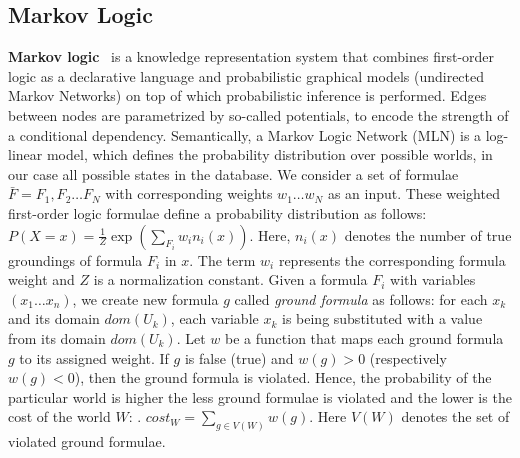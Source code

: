 \subsection{Markov Logic}


\textbf{Markov logic}~\cite{domingos2009markov} is a knowledge representation system that combines first-order logic as a declarative language and probabilistic graphical models (undirected Markov Networks) on top of which probabilistic inference is performed.  Edges between nodes are parametrized by so-called potentials, to encode the strength of a conditional dependency.   
Semantically, a Markov Logic Network (MLN) is a log-linear model, which defines the probability 
distribution over possible worlds, in our case all possible states in the database.%
We consider a set of formulae $\bar{F} = F_1, F_2 \dots F_N$ with corresponding weights $w_1 \dots w_N$ as an input.  These weighted first-order logic formulae define a probability distribution as follows: $P \left( X = x \right) = \frac{1}{Z} \exp\left( \sum_{F_i} w_i n_i \left( x \right) \right)$. Here, $n_i(x)$ denotes the number of true groundings of formula $F_i$ in $x$. The term $w_i$ represents the corresponding formula weight and $Z$ is a normalization constant. 
Given a formula $F_i$ with variables $(x_1 \dots x_n)$, we create new formula $g$ called \textit{ground formula}  as follows: for each $x_k$ and its domain $dom(U_k)$, each variable $x_k$ is being substituted with a value from its domain $dom(U_k)$.
Let $w$ be a function that maps each ground formula $g$ to its assigned weight. If $g$ is false (true) and $w(g)>0$ (respectively $w(g)<0$), then the ground formula is violated. Hence, the probability of the particular world is higher the less ground formulae is violated and the lower is the cost of the world $W$: . $cost_W = \sum_{g \in V(W)} w(g)$. Here $V(W)$ denotes the set of violated ground formulae.

